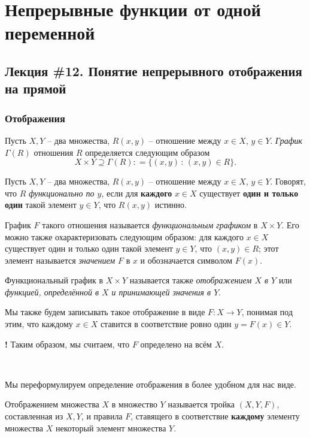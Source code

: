 \chapter{Непрерывные функции от одной переменной}

\section{Лекция \#12. Понятие непрерывного отображения на прямой}


\subsection{Отображения}
Пусть $X,Y$ -- два множества, $R(x,y)$ -- отношение между $x \in X$, $y \in Y$. \textit{График} $\Gamma(R)$ отношения $R$ определяется следующим образом
\[
 X \times Y \supseteq \Gamma(R) : = \{(x,y) \, :\, (x,y) \in R\}.
\]

Пусть $X,Y$ -- два множества, $R(x,y)$ -- отношение между $x \in X$, $y \in Y$. Говорят, что $R$ \textit{функционально по $y$}, если для \textbf{каждого} $x\in X$ существует \textbf{один и только один} такой элемент $y\in Y$, что $R(x,y)$ истинно.

График $F$ такого отношения называется \textit{функциональным графиком} в $X \times Y$. Его можно также охарактеризовать следующим образом:  для каждого $x \in X$ существует один и только один такой элемент $y \in Y$, что $(x,y) \in R$; этот элемент называется \textit{значением} $F$ в $x$ и обозначается символом $F(x)$.

\begin{definition}
 Функциональный график в $X \times Y$ называется также \textit{отображением $X$ в $Y$} или \textit{функцией, определённой в $X$ и принимающей значения в $Y.$}    
\end{definition}

Мы также будем записывать такое отображение в виде $F:X \to Y$, понимая под этим, что каждому $x \in X$ ставится в соответствие ровно один $y  = F(x)\in Y$.

\begin{mydangerr}{\bf !}
    Таким образом, мы считаем, что $F$ определено на всём $X.$ 
\end{mydangerr}
~

Мы переформулируем определение отображения в более удобном для нас виде.

\begin{definition}
    Отображением множества $X$ в множество $Y$ называется тройка $(X,Y,F)$, составленная из $X,Y$, и правила $F$, ставящего в соответствие \textbf{каждому} элементу множества $X$ некоторый элемент множества $Y$.
\end{definition}

